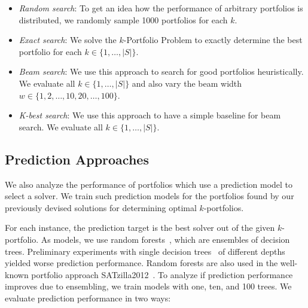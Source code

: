 \documentclass[conference]{IEEEtran}
\begin{document}
\begin{itemize}
	\item \emph{Random search}:
	To get an idea how the performance of arbitrary portfolios is distributed, we randomly sample 1000 portfolios for each $k$.
	\item \emph{Exact search}:
	We solve the $k$-Portfolio Problem to exactly determine the best portfolio for each $k \in \{1, \dots, |S|\}$.
	\item \emph{Beam search}: 
	We use this approach to search for good portfolios heuristically.
	We evaluate all $k \in \{1, \dots, |S|\}$ and also vary the beam width $w \in \{1, 2, \dots, 10, 20, \dots, 100\}$.
	\item \emph{K-best search}:
	We use this approach to have a simple baseline for beam search.
	We evaluate all $k \in \{1, \dots, |S|\}$.
\end{itemize}


\subsection{Prediction Approaches}

We also analyze the performance of portfolios which use a prediction model to select a solver. 
We train such prediction models for the portfolios found by our previously devised solutions for determining optimal $k$-portfolios. 

For each instance, the prediction target is the best solver out of the given $k$-portfolio.
As models, we use random forests~\cite{breiman2001random}, which are ensembles of decision trees. 
Preliminary experiments with single decision trees~\cite{breiman1984classification} of different depths yielded worse prediction performance. 
Random forests are also used in the well-known portfolio approach SATzilla2012~\cite{xu2012satzilla2012}. 
To analyze if prediction performance improves due to ensembling, we train models with one, ten, and 100 trees.
We evaluate prediction performance in two ways:
\end{document}
